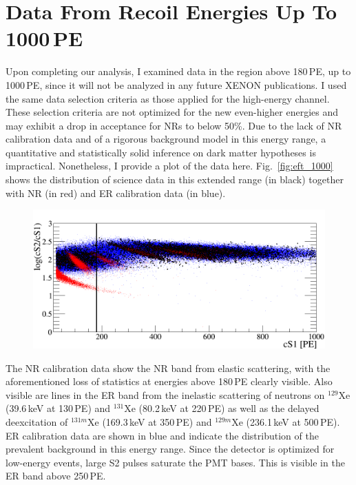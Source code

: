 \section{Data From Recoil Energies Up To 1000\,PE}
\label{sec:SuperHighE}
Upon completing our analysis, I examined data in the \cSi{} region above 180\,PE, up to 1000\,PE, since it will not be analyzed in any future XENON publications. I used the same data selection criteria as those applied for the high-energy channel. These selection criteria are not optimized for the new even-higher energies and may exhibit a drop in acceptance for NRs to below 50\%. Due to the lack of NR calibration data and of a rigorous background model in this energy range, a quantitative and statistically solid inference on dark matter hypotheses is impractical. Nonetheless, I provide a plot of the data here. Fig.~\ref{fig:eft_1000} shows the distribution of science data in this extended range (in black) together with NR (in red) and ER calibration data (in blue).

\begin{figure}
\centerline{\includegraphics[width=1.\linewidth]{fig/superhighE.png}}
\end{figure}  

The NR calibration data show the NR band from elastic scattering, with the aforementioned loss of statistics at energies above 180\,PE clearly visible. Also visible are lines in the ER band from the inelastic scattering of neutrons on $^{129}$Xe (39.6\,keV at 130\,PE) and $^{131}$Xe (80.2\,keV at 220\,PE) as well as the delayed deexcitation of $^{131m}$Xe (169.3\,keV at 350\,PE) and $^{129m}$Xe (236.1\,keV at 500\,PE). ER calibration data are shown in blue and indicate the distribution of the prevalent background in this energy range. Since the detector is optimized for low-energy events, large S2 pulses saturate the PMT bases. This is visible in the ER band above 250\,PE.

